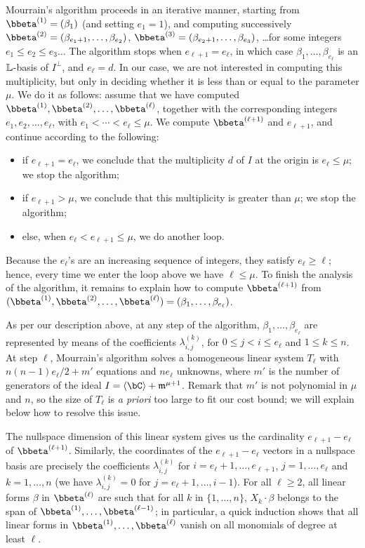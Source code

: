 \documentclass[12pt]{article}
\begin{document}
Mourrain's algorithm proceeds in an iterative manner, starting from
$\bbeta^{(1)}=(\beta_{1})$ (and setting $e_1=1$), and computing
successively $\bbeta^{(2)}=(\beta_{e_1+1},\dots,\beta_{e_2})$,
$\bbeta^{(3)}=(\beta_{e_2+1},\dots,\beta_{e_3})$, \dots for some
integers $e_1 \le e_2 \le e_3 \dots$ The algorithm stops when
$e_{\ell+1}=e_{\ell}$, in which case $\beta_1,\dots,\beta_{e_\ell}$ is
an $\mathbb{L}$-basis of $I^\perp$, and $e_\ell=d$. In our case, we
are not interested in computing this multiplicity, but only in
deciding whether it is less than or equal to the parameter $\mu$. We do it as follows: assume that we have
computed $\bbeta^{(1)},\bbeta^{(2)},\dots,\bbeta^{(\ell)}$, together
with the corresponding integers $e_1,e_2,\dots,e_\ell$, with $e_1 <
\cdots < e_\ell \le \mu$. We compute $\bbeta^{(\ell+1)}$ and $e_{\ell+1}$,
and continue according to the following:
\begin{itemize}
\item if $e_{\ell+1}=e_{\ell}$, we conclude that the multiplicity
  $d$ of $I$ at the origin is $e_\ell \le \mu$; we stop the
  algorithm;
\item if $e_{\ell+1} > \mu$, we conclude that this multiplicity is greater 
  than $\mu$; we stop the algorithm;
\item else, when $e_\ell < e_{\ell+1} \le \mu$, we do another loop.
\end{itemize}
Because the $e_\ell$'s are an increasing sequence of integers, they
satisfy $e_\ell \ge \ell$; hence, every time we enter the loop above we
have $\ell \le \mu$. To finish the analysis of the algorithm, it
remains to explain how to compute $\bbeta^{(\ell+1)}$ from
$(\bbeta^{(1)},\bbeta^{(2)},\dots,\bbeta^{(\ell)})=(\beta_{1},\dots,\beta_{e_\ell})$.

As per our description above, at any step of the algorithm,
$\beta_{1},\dots,\beta_{e_\ell}$ are represented by means of the
coefficients $\lambda^{(k)}_{i,j}$, for $0 \le j < i \le e_{\ell}$ and
$1 \le k \le n$.  At step $\ell$, Mourrain's algorithm solves a homogeneous linear system
$T_\ell$ with $n(n-1) e_\ell/2+m'$ equations and $n e_\ell$ unknowns,
where $m'$ is the number of generators of the ideal $I= \langle \bC
\rangle + \m^{\mu+1}$. Remark that $m'$ is not polynomial in $\mu$ 
and $n$, so the size of $T_\ell$ is {\em a priori} too large to 
fit our cost bound; we will explain below how to resolve this issue.

The nullspace dimension of this linear system gives us the cardinality
$e_{\ell+1}-e_{\ell}$ of $\bbeta^{(\ell+1)}$. Similarly, the coordinates of
the $e_{\ell+1}-e_{\ell}$ vectors in a nullspace basis are precisely
the coefficients $\lambda^{(k)}_{i,j}$ for
$i=e_{\ell}+1,\dots,e_{\ell+1}$, $j=1,\dots,e_\ell$ and $k=1,\dots,n$
(we have $\lambda^{(k)}_{i,j}=0$ for $j=e_{\ell}+1,\dots,i-1$). For
all $\ell \ge 2$, all linear forms $\beta$ in $\bbeta^{(\ell)}$ are
such that for all $k$ in $\{1,\dots,n\}$, $X_k \cdot \beta$ belongs to
the span of $\bbeta^{(1)},\dots,\bbeta^{(\ell-1)}$; in particular, a
quick induction shows that all linear forms in
$\bbeta^{(1)},\dots,\bbeta^{(\ell)}$ vanish on all monomials of degree
at least $\ell$.
\end{document}
